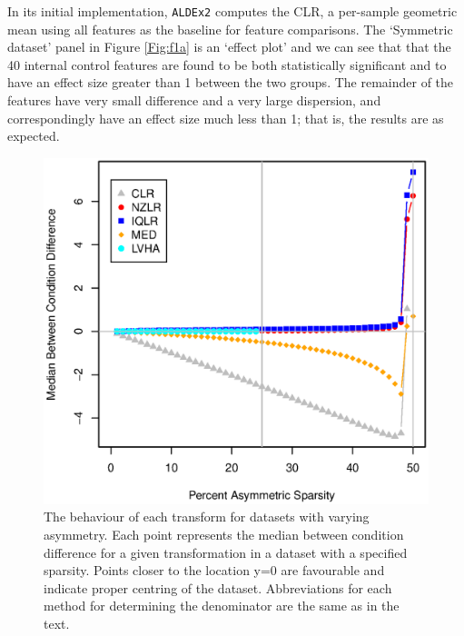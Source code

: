 \documentclass[graybox]{svmult}
\providecommand{\DIFdelend}{} %
\begin{document}
\DIFdelend In its initial implementation, \texttt{ALDEx2} computes the CLR, a per-sample geometric mean using all features as the baseline for feature comparisons. The `Symmetric dataset' panel in Figure \ref{Fig:f1a} is an `effect plot' \cite{gloor:effect} and we can see that that the 40 internal control features are found to be both statistically significant and to have an effect size greater than 1 between the two groups. The remainder of the features have very small difference and a very large dispersion, and correspondingly have an effect size much less than 1; that is, the results are as expected. 

%
\begin{figure}[b]
\sidecaption[t]
\includegraphics[scale=.45]{Fig_failure-book.eps}
%
%
\caption{The behaviour of each transform for datasets with varying asymmetry. Each point represents the median between condition difference for a given transformation in a dataset with a specified sparsity. Points closer to the location y=0 are favourable and indicate proper centring of the dataset. Abbreviations for each method for determining the denominator are the same as in the text.}
\label{Fig:f2a}       %
\end{figure}
\end{document}
